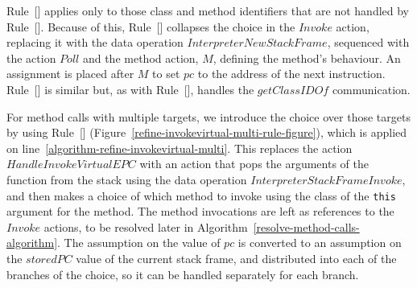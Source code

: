 Rule~[] applies only to those
class and method identifiers that are not handled by
Rule~[].
Because of this, Rule~[] collapses
the choice in the $Invoke$ action, replacing it with the data
operation $InterpreterNewStackFrame$, sequenced with the action $Poll$
and the method action, $M$, defining the method's behaviour.
An assignment is placed after $M$ to set $pc$ to the address of the
next instruction.
Rule~[] is similar but, as
with Rule~[], handles the
$getClassIDOf$ communication.

For method calls with multiple targets, we introduce the choice over
those targets by using
Rule~[]
(Figure~\ref{refine-invokevirtual-multi-rule-figure}), which is
applied on line~\ref{algorithm-refine-invokevirtual-multi}.
This replaces the action $HandleInvokeVirtualEPC$ with an action that
pops the arguments of the function from the stack using the data
operation $InterpreterStackFrameInvoke$, and then makes a choice of
which method to invoke using the class of the \texttt{this} argument
for the method.
The method invocations are left as references to the $Invoke$ actions,
to be resolved later in
Algorithm~\ref{resolve-method-calls-algorithm}.
The assumption on the value of $pc$ is converted to an assumption on
the $storedPC$ value of the current stack frame, and distributed into
each of the branches of the choice, so it can be handled separately
for each branch.

